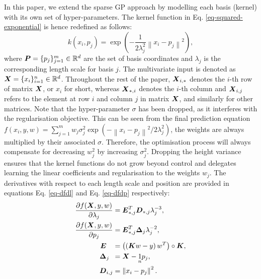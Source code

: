 \documentclass[useAMS,usenatbib,fleqn]{mn2e}
\begin{document}
In this paper, we extend the sparse GP approach by modelling each basis (kernel) with its own set of hyper-parameters. The kernel function in Eq. \eqref{eq-squared-exponential} is hence redefined as follows:
\begin{equation}
\label{eq-squared-exponential-extension}
k(x_{i},p_{j}) = \exp{\left(-\frac{1}{2\lambda_{j}^{2}}\left\| x_{i}-p_{j}\right\|^{2}\right)},
\end{equation}
where $\bmath{P}=\{p_{j}\}_{j=1}^{m} \in \mathbb{R}^{d}$ are the set of basis coordinates and $\lambda_{j}$ is the corresponding length scale for basis $j$. The multivariate input is denoted as $\bmath{X}=\{x_{i}\}_{i=1}^{n} \in \mathbb{R}^{d}$. Throughout the rest of the paper, $\bmath{X}_{i,*}$ denotes the $i$-th row of matrix $\bmath{X}$, or $x_{i}$ for short, whereas $\bmath{X}_{*,i}$ denotes the $i$-th column and $\bmath{X}_{i,j}$ refers to the element at row $i$ and column $j$ in matrix $\bmath{X}$, and similarly for other matrices. Note that the hyper-parameter $\sigma$ has been dropped, as it interferes with the regularisation objective. This can be seen from the final prediction equation $f(x_{i},y,w)=\sum_{j=1}^{m}w_{j}\sigma_{j}^{2}\exp{\left(-\left\| x_{i}-p_{j}\right\|^{2}/2\lambda_{j}^{2}\right)}$, the weights are always multiplied by their associated $\sigma$. Therefore, the optimisation process will always compensate for decreasing $w_{j}^{2}$ by increasing $\sigma_{j}^{2}$. Dropping the height variance ensures that the kernel functions do not grow beyond control and delegates learning the linear coefficients and regularisation to the weights $w_{j}$. The derivatives with respect to each length scale and position are provided in equations Eq. \eqref{eq-dfdl} and Eq. \eqref{eq-dfdp} respectively:
\begin{subequations}
\begin{align}
\label{eq-dfdl}
\frac{\partial f(\bmath{X},y,w)}{\partial \lambda_{j}} &=\bmath{E}_{*,j}^{T}\bmath{D}_{*,j}\lambda_{j}^{-3},\\
\label{eq-dfdp}
\frac{\partial f(\bmath{X},y,w)}{\partial p_{j}} &=\bmath{E}_{*,j}^{T}\mathbf\Delta_{j}\lambda_{j}^{-2},\\
\bmath{E}\phantom{_{i,j}} &= \left(\left(\bmath{K}w-y\right)w^{T}\right)\circ\bmath{K},\\
\mathbf\Delta_{j\phantom{,i}} &= \bmath{X}-\underset{n}{1}p_{j},\\
\bmath{D}_{i,j} &= \left \| x_{i}-p_{j}\right\|^{2}.
\end{align}
\end{subequations}
\end{document}
